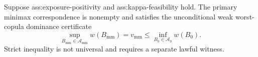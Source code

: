 Suppose ass:exposure-positivity and ass:kappa-feasibility hold.  The primary minimax correspondence is nonempty and satisfies the unconditional weak worst-copula dominance certificate
\[
\sup_{B_{\mathrm{mm}}\in\mathcal A_{\mathrm{mm}}}w(B_{\mathrm{mm}})
=v_{\mathrm{mm}}
\le
\inf_{B_0\in\mathcal A_0}w(B_0).
\]
Strict inequality is not universal and requires a separate lawful witness.